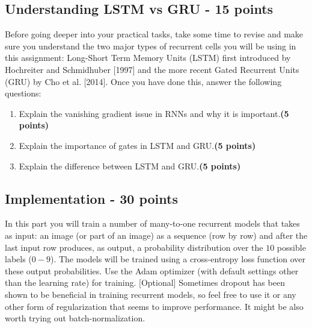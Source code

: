\documentclass[12pt]{article}
\begin{document}
\subsection{Understanding LSTM vs GRU - 15 points}
Before going deeper into your practical tasks, take some time to revise and make sure you understand the two major types of recurrent cells you will be using in this assignment: Long-Short Term Memory Units (LSTM) first introduced by Hochreiter and Schmidhuber [1997] and the more recent Gated Recurrent Units (GRU) by Cho et al. [2014]. Once you have done this, answer the following questions:
\begin{enumerate}[label=(\roman*)]
\item Explain the vanishing gradient issue in RNNs and why it is important.\textbf{(5 points)}
\item Explain the importance of gates in LSTM and GRU.\textbf{(5 points)}
\item Explain the difference between LSTM and GRU.\textbf{(5 points)}
\end{enumerate}

\subsection{Implementation - 30 points}
In this part you will train a number of many-to-one recurrent models that takes as input: an image (or part of an image) as a sequence (row by row) and after the last input row produces, as output, a probability distribution over the $10$ possible labels ($0-9$). The models will be trained using a cross-entropy loss function over these output probabilities. Use the Adam optimizer (with default settings other than the learning rate) for training. [Optional] Sometimes dropout has been shown to be beneficial in training recurrent models, so feel free to use it or any other form of regularization that seems to improve performance. It might be also worth trying out batch-normalization. \\ \newline
\end{document}
